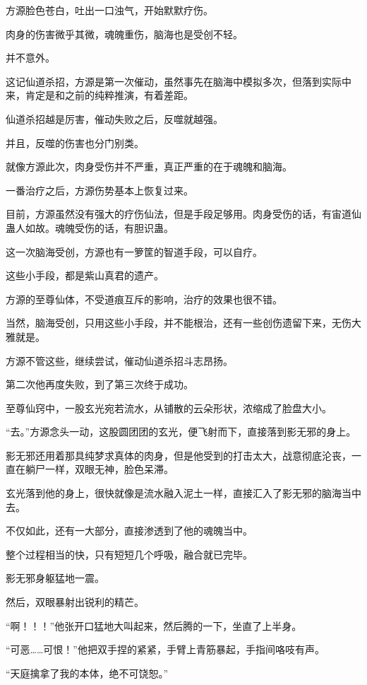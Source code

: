 \begin{this_body}
方源脸色苍白，吐出一口浊气，开始默默疗伤。

肉身的伤害微乎其微，魂魄重伤，脑海也是受创不轻。

并不意外。

这记仙道杀招，方源是第一次催动，虽然事先在脑海中模拟多次，但落到实际中来，肯定是和之前的纯粹推演，有着差距。

仙道杀招越是厉害，催动失败之后，反噬就越强。

并且，反噬的伤害也分门别类。

就像方源此次，肉身受伤并不严重，真正严重的在于魂魄和脑海。

一番治疗之后，方源伤势基本上恢复过来。

目前，方源虽然没有强大的疗伤仙法，但是手段足够用。肉身受伤的话，有宙道仙蛊人如故。魂魄受伤的话，有胆识蛊。

这一次脑海受创，方源也有一箩筐的智道手段，可以自疗。

这些小手段，都是紫山真君的遗产。

方源的至尊仙体，不受道痕互斥的影响，治疗的效果也很不错。

当然，脑海受创，只用这些小手段，并不能根治，还有一些创伤遗留下来，无伤大雅就是。

方源不管这些，继续尝试，催动仙道杀招斗志昂扬。

第二次他再度失败，到了第三次终于成功。

至尊仙窍中，一股玄光宛若流水，从铺散的云朵形状，浓缩成了脸盘大小。

“去。”方源念头一动，这股圆团团的玄光，便飞射而下，直接落到影无邪的身上。

影无邪还用着那具纯梦求真体的肉身，但是他受到的打击太大，战意彻底沦丧，一直在躺尸一样，双眼无神，脸色呆滞。

玄光落到他的身上，很快就像是流水融入泥土一样，直接汇入了影无邪的脑海当中去。

不仅如此，还有一大部分，直接渗透到了他的魂魄当中。

整个过程相当的快，只有短短几个呼吸，融合就已完毕。

影无邪身躯猛地一震。

然后，双眼暴射出锐利的精芒。

“啊！！！”他张开口猛地大叫起来，然后腾的一下，坐直了上半身。

“可恶……可恨！”他把双手捏的紧紧，手臂上青筋暴起，手指间咯吱有声。

“天庭擒拿了我的本体，绝不可饶恕。”


\end{this_body}
